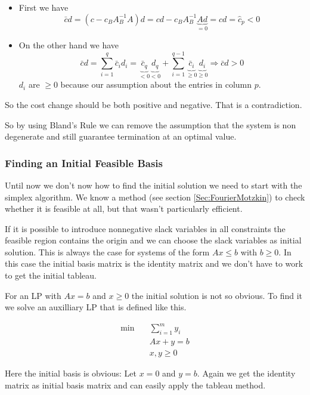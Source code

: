 \begin{pr}
\begin{itemize}
\item First we have 
\[\bar cd = (c - c_B A_B^{-1} A) d= cd - c_B A_B^{-1}\underbrace{Ad}_{=0} = cd = \hat c_p<0\]

\item On the other hand we have
\[\bar c d = \sum_{i=1}^{q} \bar c_i d_i = \underbrace{\bar c_q}_{<0}\underbrace{d_q}_{<0} + \sum _{i=1}^{q-1} \underbrace{\bar c_i}_{\geq 0}\underbrace{d_i}_{\geq 0} \Rightarrow \bar c d >0\]
$d_i$ are $\geq 0$ because our assumption about the entries in column $p$. %

\end{itemize}

So the cost change should be both positive and negative. That is a contradiction.
\end{pr}

So by using Bland's Rule we can remove the assumption that the system is non degenerate and still guarantee termination at an optimal value.

\subsubsection{Finding an Initial Feasible Basis}

Until now we don't now how to find the initial solution we need to start with the simplex algorithm. We know a method (see section \ref{Sec:FourierMotzkin}) to check whether it is feasible at all, but that wasn't particularly efficient. 

If it is possible to introduce nonnegative slack variables in all constraints the feasible region contains the origin and we can choose the slack variables as initial solution. This is always the case for systems of the form $Ax\leq b$ with $b\geq 0$. In this case the initial basis matrix is the identity matrix and we don't have to work to get the initial tableau.

For an LP with $Ax=b$ and $x\geq 0$ the initial solution is not so obvious. To find it we solve an auxilliary LP that is defined like this.

\begin{align*}
\min \quad & \sum_{i=1}^m y_i\\
&Ax+y=b\\
&x,y\geq 0
\end{align*}

Here the initial basis is obvious: Let $x=0$ and $y=b$. Again we get the identity matrix as initial basis matrix and can easily apply the tableau method.


